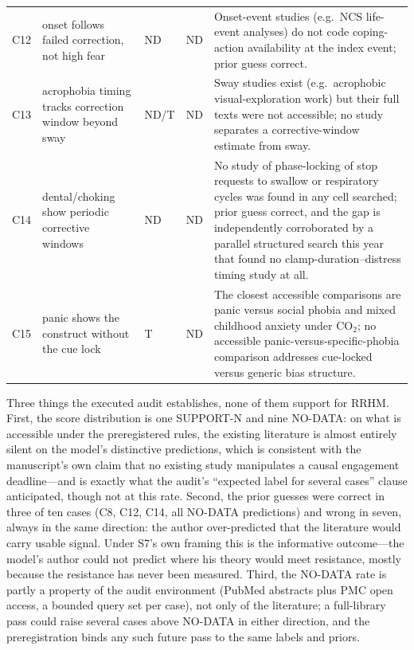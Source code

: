 \documentclass[9pt,twocolumn]{article}
\begin{document}
\begin{table}[!t]
\begin{tabularx}{\textwidth}{p{}p{}p{}p{}X}
C12 & onset follows failed correction, not high fear & ND & ND & Onset-event studies (e.g.\ NCS life-event analyses) do not code coping-action availability at the index event; prior guess correct. \\
C13 & acrophobia timing tracks correction window beyond sway & ND/T & ND & Sway studies exist (e.g.\ acrophobic visual-exploration work) but their full texts were not accessible; no study separates a corrective-window estimate from sway. \\
C14 & dental/choking show periodic corrective windows & ND & ND & No study of phase-locking of stop requests to swallow or respiratory cycles was found in any cell searched; prior guess correct, and the gap is independently corroborated by a parallel structured search this year that found no clamp-duration--distress timing study at all. \\
C15 & panic shows the construct without the cue lock & T & ND & The closest accessible comparisons are panic versus social phobia and mixed childhood anxiety under CO$_2$; no accessible panic-versus-specific-phobia comparison addresses cue-locked versus generic bias structure. \\
\bottomrule
\end{tabularx}
\end{table}

Three things the executed audit establishes, none of them support for RRHM. First, the score distribution is one SUPPORT-N and nine NO-DATA: on what is accessible under the preregistered rules, the existing literature is almost entirely silent on the model's distinctive predictions, which is consistent with the manuscript's own claim that no existing study manipulates a causal engagement deadline---and is exactly what the audit's ``expected label for several cases'' clause anticipated, though not at this rate. Second, the prior guesses were correct in three of ten cases (C8, C12, C14, all NO-DATA predictions) and wrong in seven, always in the same direction: the author over-predicted that the literature would carry usable signal. Under S7's own framing this is the informative outcome---the model's author could not predict where his theory would meet resistance, mostly because the resistance has never been measured. Third, the NO-DATA rate is partly a property of the audit environment (PubMed abstracts plus PMC open access, a bounded query set per case), not only of the literature; a full-library pass could raise several cases above NO-DATA in either direction, and the preregistration binds any such future pass to the same labels and priors.
\end{document}

